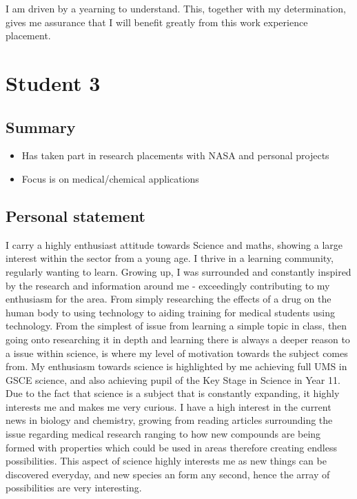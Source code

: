 \documentclass{article}
\begin{document}
I am driven by a yearning to understand. This, together with my determination,
gives me assurance that I will benefit greatly from this work experience
placement.


\section*{Student 3}

\subsection*{Summary}
\begin{itemize}
    \item Has taken part in research placements with NASA and personal projects
    \item Focus is on medical/chemical applications
\end{itemize}

\subsection*{Personal statement}

I carry a highly enthusiast attitude towards Science and maths, showing a large
interest within the sector from a young age. I thrive in a learning community,
regularly wanting to learn. Growing up, I was surrounded and constantly inspired
by the research and information around me - exceedingly contributing to my
enthusiasm for the area. From simply researching the effects of a drug on the
human body to using technology to aiding training for medical students using
technology. From the simplest of issue from learning a simple topic in class,
then going onto researching it in depth and learning there is always a deeper
reason to a issue within science, is where my level of motivation towards the
subject comes from. My enthusiasm towards science is highlighted by me achieving
full UMS in GSCE science, and also achieving pupil of the Key Stage in Science
in Year 11.\\

Due to the fact that science is a subject that is constantly expanding, it
highly interests me and makes me very curious. I have a high interest in the
current news in biology and chemistry, growing from reading articles surrounding
the issue regarding medical research ranging to how new compounds are being
formed with properties which could be used in areas therefore creating endless
possibilities. This aspect of science highly interests me as new things can be
discovered everyday, and new species an form any second, hence the array of
possibilities are very interesting.\\
\end{document}
